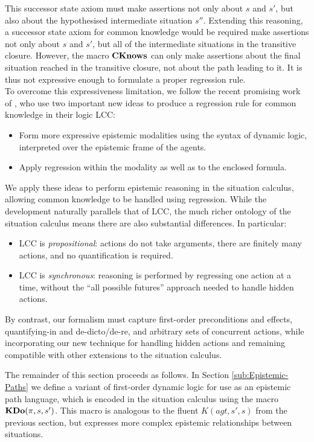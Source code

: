 This successor state axiom must make assertions not only about $s$
and $s'$, but also about the hypothesised intermediate situation
$s''$. Extending this reasoning, a successor state axiom for common
knowledge would be required make assertions not only about $s$ and
$s'$, but all of the intermediate situations in the transitive closure.
However, the macro $\mathbf{CKnows}$ can only make assertions about the final
situation reached in the transitive closure, not about the path leading
to it. It is thus not expressive enough to formulate a proper regression
rule.\\


To overcome this expressiveness limitation, we follow the recent promising
work of \citep{vanBenthem06lcc}, who use two important new ideas
to produce a regression rule for common knowledge in their logic LCC:

\begin{itemize}
\item Form more expressive epistemic modalities using the syntax of dynamic
logic, interpreted over the epistemic frame of the agents.
\item Apply regression within the modality as well as to the enclosed formula.
\end{itemize}
We apply these ideas to perform epistemic reasoning in the situation
calculus, allowing common knowledge to be handled using regression.
While the development naturally parallels that of LCC, the much richer
ontology of the situation calculus means there are also substantial
differences. In particular:

\begin{itemize}
\item LCC is \emph{propositional}: actions do not take arguments, there
are finitely many actions, and no quantification is required.
\item LCC is \emph{synchronous}:\emph{ }reasoning is performed by regressing
one action at a time, without the {}``all possible futures'' approach
needed to handle hidden actions.
\end{itemize}
By contrast, our formalism must capture first-order preconditions
and effects, quantifying-in and de-dicto/de-re, and arbitrary sets
of concurrent actions, while incorporating our new technique for handling
hidden actions and remaining compatible with other extensions to the
situation calculus.

The remainder of this section proceeds as follows. In Section \ref{sub:Epistemic-Paths}
we define a variant of first-order dynamic logic for use as an epistemic
path language, which is encoded in the situation calculus using the
macro $\mathbf{KDo}(\pi,s,s')$. This macro is analogous to the fluent $K(agt,s',s)$
from the previous section, but expresses more complex epistemic relationships
between situations.

